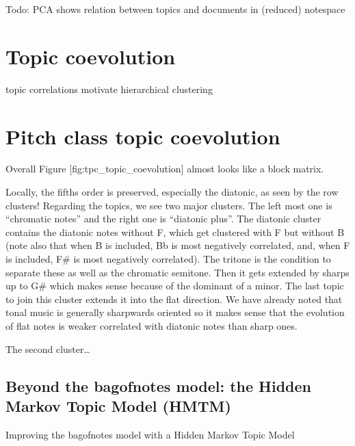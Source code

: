 \documentclass[letterpaper,10pt,english]{sphinxmanual}
\begin{document}
\sphinxAtStartPar
Todo: PCA shows relation between topics and documents in (reduced)
note\sphinxhyphen{}space


\section{Topic coevolution}
\label{\detokenize{topic_modeling:topic-coevolution}}
\sphinxAtStartPar
topic correlations motivate hierarchical clustering


\section{Pitch class \textendash{} topic coevolution}
\label{\detokenize{topic_modeling:pitch-class-topic-coevolution}}
\sphinxAtStartPar
Overall Figure {[}fig:tpc\_topic\_coevolution{]} almost looks like a block
matrix.

\sphinxAtStartPar
Locally, the fifths order is preserved, especially the diatonic, as seen
by the row clusters! Regarding the topics, we see two major clusters.
The left most one is “chromatic notes” and the right one is “diatonic
plus”. The diatonic cluster contains the diatonic notes without F, which
get clustered with F but without B (note also that when B is included,
Bb is most negatively correlated, and, when F is included, F\# is most
negatively correlated). The tritone is the condition to separate these
as well as the chromatic semitone. Then it gets extended by sharps up to
G\# which makes sense because of the dominant of a minor. The last topic
to join this cluster extends it into the flat direction. We have already
noted that tonal music is generally sharpwards oriented so it makes
sense that the evolution of flat notes is weaker correlated with
diatonic notes than sharp ones.

\sphinxAtStartPar
The second cluster…


\subsection{Beyond the bag\sphinxhyphen{}of\sphinxhyphen{}notes model: the Hidden Markov Topic Model (HMTM)}
\label{\detokenize{topic_modeling:beyond-the-bag-of-notes-model-the-hidden-markov-topic-model-hmtm}}
\sphinxAtStartPar
Improving the bag\sphinxhyphen{}of\sphinxhyphen{}notes model with a Hidden Markov Topic Model
\end{document}
